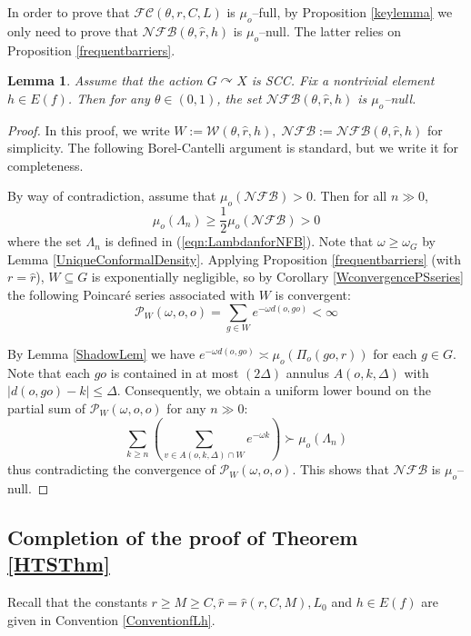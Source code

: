 \documentclass{amsart}
\newtheorem{lem}[thm]{Lemma}
\theoremstyle{definition}
\theoremstyle{remark}
\newcommand{\act}{\curvearrowright}
\newcommand{\p}{\mathcal P}
\newcommand{\U}{ X}
\newcommand{\e}[1]{\omega_{#1}}
\begin{document}
In order to prove that $\mathcal{FC}(\theta,r, C,L)$ is $\mu_o$--full, by Proposition \ref{keylemma} we only need to prove that $\mathcal{NFB}(\theta,\hat r, h)$ is $\mu_o$--null. 
The latter relies on Proposition \ref{frequentbarriers}.


\begin{lem}\label{FullFreqAtTheta}
Assume that the action $G\act \U$ is SCC. 
Fix  a nontrivial element  $h\in E(f)$.
Then for any $\theta\in (0,1)$, the set $\mathcal{NFB}(\theta,\hat r, h)$ is $\mu_o$--null.  
\end{lem}
\begin{proof}
In this proof, we write $W:=\mathcal{W}({\theta,\hat r,h}),\; \mathcal{NFB}:=\mathcal{NFB}({ \theta,\hat r, h})$ for simplicity. The following Borel-Cantelli argument is standard, but we write it for completeness. 

By way of contradiction,  assume that $\mu_o(\mathcal{NFB})>0$.  Then  for all $n\gg 0$,  $$\mu_o(\Lambda_n)\ge \frac{1}{2}\mu_o(\mathcal{NFB})>0$$ where the set $\Lambda_n$ is defined in (\ref{eqn:LambdanforNFB}). Note that $\omega\ge \e G$ by Lemma \ref{UniqueConformalDensity}. Applying Proposition \ref{frequentbarriers} (with $r=\hat r$), $W\subseteq G$ is exponentially negligible, so by Corollary \ref{WconvergencePSseries} the following Poincar\'e series  associated with $W$ is convergent:
$$
\p_{W}(\omega, o,o)=\sum_{g\in W} e^{-\omega d(o,go)}<\infty 
$$

By  Lemma    \ref{ShadowLem} we have  $e^{-\omega d(o,go)} \asymp \mu_o(\Pi_o(go,\hat r))$ for each $g\in G$. Note that  each $go$ is contained in at most $(2\Delta)$   annulus  $A(o, k,\Delta)$ with $|d(o,go)-k|\le \Delta$. Consequently,   we obtain a uniform lower bound on the partial sum  of   $\p_{{W}}(\omega,o,o)$ for any $n\gg 0$:
$$
\sum\limits_{k\ge n}\left(\sum\limits_{v \in   A(o, k,\Delta)\cap {W} }    e^{-\omega k}\right) \succ \mu_o(\Lambda_n)
$$ thus  contradicting   the convergence of $\p_{W}(\omega,o,o)$. This shows that $\mathcal{NFB}$ is $\mu_o$--null.  
\end{proof}

 
    

\subsection{Completion of the proof of Theorem \ref{HTSThm}}
Recall that the constants  $r\ge M\ge C, \hat r=\hat r(r,C,M), L_0$ and $h\in E(f)$ are given in Convention \ref{ConventionfLh}. 
\end{document}
